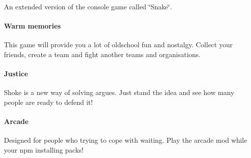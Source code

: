 An extended version of the console game called \char`\"{}\+Snake\char`\"{}. \paragraph*{Warm memories}

This game will provide you a lot of oldschool fun and nostalgy. Collect your friends, create a team and fight another teams and organisations. \paragraph*{Justice}

Shoke is a new way of solving argues. Just stand the idea and see how many people are ready to defend it! \paragraph*{Arcade}

Designed for people who trying to cope with waiting. Play the arcade mod while your npm installing packs! 
